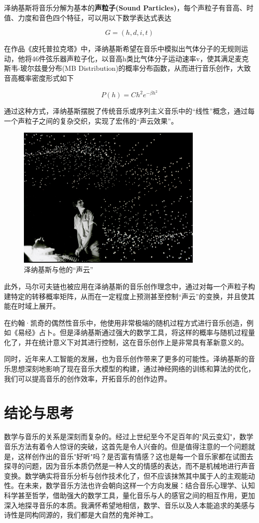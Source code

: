 \documentclass{article}
\begin{document}
泽纳基斯将音乐分解为基本的\textbf{声粒子(Sound Particles)}，每个声粒子有音高、时值、力度和音色四个特征，可以用以下数学表达式表达

\[
    G = (h, d, i, t)
\]

在作品《皮托普拉克塔》中，泽纳基斯希望在音乐中模拟出气体分子的无规则运动，他将46件弦乐器声粒子化，以音高h类比气体分子运动速率v，使其满足麦克斯韦-玻尔兹曼分布(MB Distribution)的概率分布函数，从而进行音乐创作，大致音高概率密度形式如下

\[
    P(h) = C h^2 e^{- \beta h^2}
\]

通过这种方式，泽纳基斯摆脱了传统音乐或序列主义音乐中的“线性”概念，通过每一个声粒子之间的复杂交织，实现了宏伟的“声云效果”。

\begin{figure}[h!]
    \centering
    \includegraphics[width=0.8\textwidth]{image/im3.png}
    \caption{泽纳基斯与他的“声云”}
    \label{fig:xenakis_clouds}
\end{figure}

此外，马尔可夫链也被应用在泽纳基斯的音乐创作理念中，通过对每一个声粒子构建特定的转移概率矩阵，从而在一定程度上预测甚至控制“声云”的变换，并且使其能在时域上展开。

在约翰·凯奇的偶然性音乐中，他使用非常极端的随机过程方式进行音乐创造，例如《易经》占卜。但是泽纳基斯通过强大的数学工具，将这样的概率与随机过程量化了，并在统计意义下对其进行控制，这在音乐创作上是非常具有革新意义的。

同时，近年来人工智能的发展，也为音乐创作带来了更多的可能性。泽纳基斯的音乐思想深刻地影响了现在音乐大模型的构建，通过神经网络的训练和算法的优化，我们可以提高音乐的创作效率，开拓音乐的创作边界。

\section{结论与思考}
数学与音乐的关系是深刻而复杂的。经过上世纪至今不足百年的"风云变幻"，数学音乐方法有着令人惊讶的突破，这首先是令人兴奋的。但是值得注意的一个问题就是，这样创作出的音乐"好听"吗？是否富有情感？这也是每一个音乐家都在试图去探寻的问题，因为音乐本质仍然是一种人文的情感的表达，而不是机械地进行声音变换。数学确实将音乐分析与创作技术化了，但不应该抹煞其中属于人的主观能动性。在未来，数学音乐方法也许会朝向这样一个方向发展：结合音乐心理学、认知科学甚至哲学，借助强大的数学工具，量化音乐与人的感官之间的相互作用，更加深入地探寻音乐的本质。我满怀希望地相信，数学、音乐以及人本能追求的美感与诗性是同构同源的，我们都是大自然的鬼斧神工。




\end{document}
